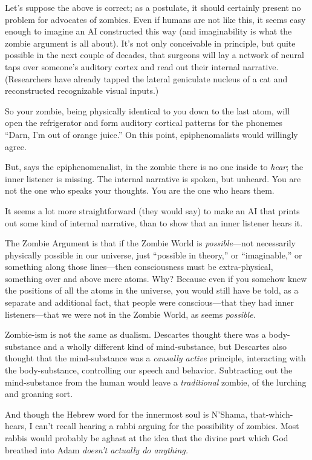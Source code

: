 {
 Let's suppose the above is correct; as a
postulate, it should certainly present no problem for advocates of
zombies. Even if humans are not like this, it seems easy enough to
imagine an AI constructed this way (and imaginability is what the
zombie argument is all about). It's not only
conceivable in principle, but quite possible in the next couple of
decades, that surgeons will lay a network of neural taps over
someone's auditory cortex and read out their internal
narrative. (Researchers have already tapped the lateral geniculate
nucleus of a cat and reconstructed recognizable visual inputs.)}

{
 So your zombie, being physically identical to you down to the last
atom, will open the refrigerator and form auditory cortical patterns
for the phonemes ``Darn, I'm out of
orange juice.'' On this point, epiphenomalists would
willingly agree.}

{
 But, says the epiphenomenalist, in the zombie there is no one
inside to \textit{hear}; the inner listener is missing. The internal
narrative is spoken, but unheard. You are not the one who speaks your
thoughts. You are the one who hears them.}

{
 It seems a lot more straightforward (they would say) to make an AI
that prints out some kind of internal narrative, than to show that an
inner listener hears it.}

{
 The Zombie Argument is that if the Zombie World is
\textit{possible}{}---not necessarily physically possible in our
universe, just ``possible in
theory,'' or
``imaginable,'' or something along
those lines---then consciousness must be extra-physical, something over
and above mere atoms. Why? Because even if you somehow knew the
positions of all the atoms in the universe, you would still have be
told, as a separate and additional fact, that people were
conscious---that they had inner listeners---that we were not in the
Zombie World, as seems \textit{possible.}}

{
 Zombie-ism is not the same as dualism. Descartes thought there was
a body-substance and a wholly different kind of mind-substance, but
Descartes also thought that the mind-substance was a \textit{causally
active} principle, interacting with the body-substance, controlling our
speech and behavior. Subtracting out the mind-substance from the human
would leave a \textit{traditional} zombie, of the lurching and groaning
sort.}

{
 And though the Hebrew word for the innermost soul is
N'Shama, that-which-hears, I can't
recall hearing a rabbi arguing for the possibility of zombies. Most
rabbis would probably be aghast at the idea that the divine part which
God breathed into Adam \textit{doesn't actually do
anything.}}

